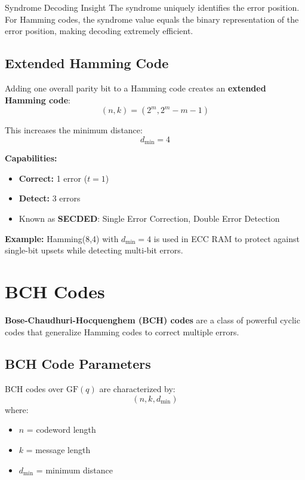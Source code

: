 \begin{calloutbox}{Syndrome Decoding Insight}
The syndrome uniquely identifies the error position. For Hamming codes, the syndrome value equals the binary representation of the error position, making decoding extremely efficient.
\end{calloutbox}

\subsection{Extended Hamming Code}

Adding one overall parity bit to a Hamming code creates an \textbf{extended Hamming code}:
\begin{equation}
(n, k) = (2^m, 2^m - m - 1)
\end{equation}

This increases the minimum distance:
\begin{equation}
d_{\min} = 4
\end{equation}

\textbf{Capabilities:}
\begin{itemize}
\item \textbf{Correct:} 1 error ($t = 1$)
\item \textbf{Detect:} 3 errors
\item Known as \textbf{SECDED}: Single Error Correction, Double Error Detection
\end{itemize}

\textbf{Example:} Hamming(8,4) with $d_{\min} = 4$ is used in ECC RAM to protect against single-bit upsets while detecting multi-bit errors.

\section{BCH Codes}\label{bch-codes}

\textbf{Bose-Chaudhuri-Hocquenghem (BCH) codes} are a class of powerful cyclic codes that generalize Hamming codes to correct multiple errors.

\subsection{BCH Code Parameters}

BCH codes over $\mathrm{GF}(q)$ are characterized by:
\begin{equation}
(n, k, d_{\min})
\end{equation}
where:
\begin{itemize}
\item $n$ = codeword length
\item $k$ = message length
\item $d_{\min}$ = minimum distance
\end{itemize}


